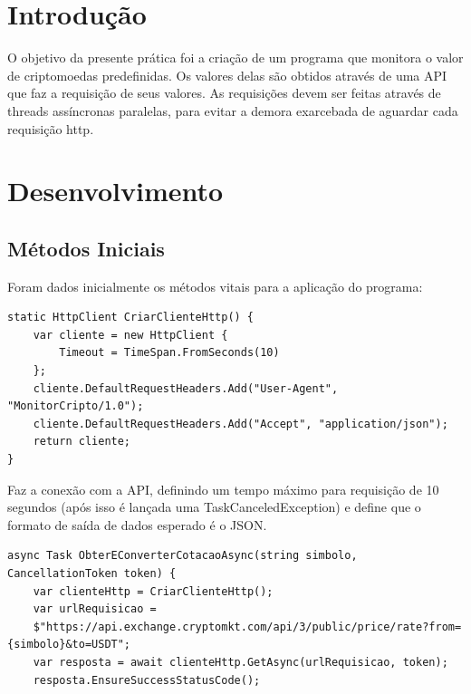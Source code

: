 \documentclass[
	12pt,				%
	oneside,			%
	a4paper,			%
	english,			%
	brazil,				%
	]{abntex2}
\begin{document}
\frenchspacing 

\imprimircapa

{
\ABNTEXchapterfont

\textual

\section{Introdução}

O objetivo da presente prática foi a criação de um programa que monitora o valor de criptomoedas predefinidas. Os valores delas são obtidos através de uma API que faz a requisição de seus valores. As requisições devem ser feitas através de threads assíncronas paralelas, para evitar a demora exarcebada de aguardar cada requisição http.

\section{Desenvolvimento}

\subsection{Métodos Iniciais}

Foram dados inicialmente os métodos vitais para a aplicação do programa:

\begin{lstlisting}
static HttpClient CriarClienteHttp() {
	var cliente = new HttpClient {
    	Timeout = TimeSpan.FromSeconds(10)
	};
	cliente.DefaultRequestHeaders.Add("User-Agent", "MonitorCripto/1.0");
	cliente.DefaultRequestHeaders.Add("Accept", "application/json");
	return cliente;
}
\end{lstlisting}

Faz a conexão com a API, definindo um tempo máximo para requisição de 10 segundos (após isso é lançada uma TaskCanceledException) e define que o formato de saída de dados esperado é o JSON.

\begin{lstlisting}
async Task ObterEConverterCotacaoAsync(string simbolo, CancellationToken token) {
	var clienteHttp = CriarClienteHttp();
	var urlRequisicao = 
    $"https://api.exchange.cryptomkt.com/api/3/public/price/rate?from={simbolo}&to=USDT";
	var resposta = await clienteHttp.GetAsync(urlRequisicao, token);
	resposta.EnsureSuccessStatusCode();


\end{lstlisting}}
\end{document}
